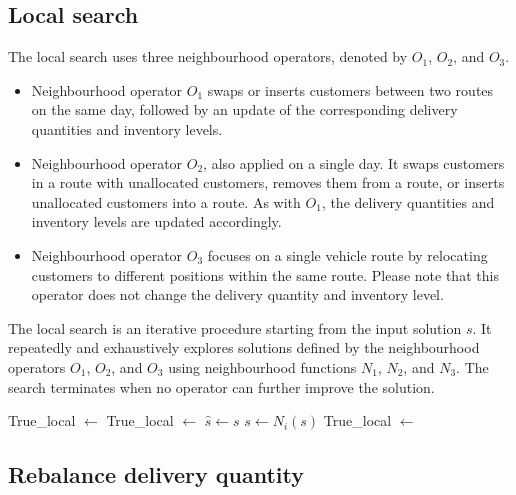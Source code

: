 \documentclass{article}
\begin{document}
\subsection{Local search}

The local search uses three neighbourhood operators, denoted by $O_1$, $O_2$, and $O_3$. 

\begin{itemize}
    \item Neighbourhood operator $O_1$ swaps or inserts customers between two routes on the same day, followed by an update of the corresponding delivery quantities and inventory levels.
    
    \item Neighbourhood operator $O_2$, also applied on a single day. It swaps customers in a route with unallocated customers, removes them from a route, or inserts unallocated customers into a route. As with $O_1$, the delivery quantities and inventory levels are updated accordingly.
    
    \item Neighbourhood operator $O_3$ focuses on a single vehicle route by relocating customers to different positions within the same route. Please note that this operator does not change the delivery quantity and inventory level. 
\end{itemize}

The local search is an iterative procedure starting from the input solution $s$. It repeatedly and exhaustively explores solutions defined by the neighbourhood operators $O_1$, $O_2$, and $O_3$ using neighbourhood functions $N_1$, $N_2$, and $N_3$. The search terminates when no operator can further improve the solution.  

\begin{algorithm}[H]
\caption{\textbf{Local search$(s)$}}
\begin{algorithmic}[1]
\STATE True\_local $\gets$ \FALSE
{}
    \STATE True\_local $\gets$ \TRUE
        \REPEAT
            \STATE $\hat{s}\gets s$
            \STATE $s\gets N_i(s)$
                \STATE True\_local $\gets$ \FALSE
            \ENDIF
    \ENDFOR
\ENDWHILE
\end{algorithmic}
\end{algorithm}




\subsection{Rebalance delivery quantity}
\end{document}
